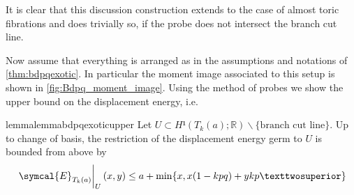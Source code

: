\documentclass[12pt,a4paper,draft]{scrartcl}
\begin{document}
It is clear that this discussion construction extends to the case of almost toric fibrations and does trivially so, if the probe does not intersect the branch cut line.

Now assume that everything is arranged as in the assumptions and notations of \cref{thm:bdpqexotic}.
In particular the moment image associated to this setup is shown in \cref{fig:Bdpq_moment_image}.
Using the method of probes we show the upper bound on the displacement energy, i.e.


\begin{restatable}{lemma}{lemmabdpqexoticupper}
    \label{thm:lemmabdpqexoticupper}
  Let $U ⊂ H¹(T_k(a);ℝ) ∖ \{\text{branch cut line}\}$.
  Up to change of basis, the restriction of the displacement energy germ to $U$ is bounded from above by
  \[ \eval{\symcal{E}_{T_k(a)}}_U (x,y) \leq a+\min\{x,x(1-kpq)+ykp²\} \]
\end{restatable}
\end{document}
